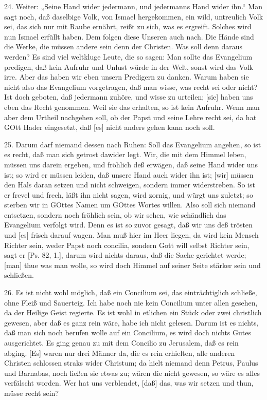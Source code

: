 24. Weiter: „Seine Hand wider jedermann, und jedermanns Hand wider ihn.“ Man sagt noch, daß daselbige Volk, von Ismael hergekommen, ein wild, untreulich Volk sei, das sich nur mit Raube ernährt, reißt zu sich, was es ergreift. Solches wird nun Ismael erfüllt haben. Dem folgen diese Unseren auch nach. Die Hände sind die Werke, die müssen andere sein denn der Christen. Was soll denn daraus werden? Es sind viel weltkluge Leute, die so sagen: Man sollte das Evangelium predigen, daß kein Aufruhr und Unlust würde in der Welt, sonst wird das Volk irre. Aber das haben wir eben unsern Predigern zu danken. Warum haben sie nicht also das Evangelium vorgetragen, daß man wisse, was recht sei oder nicht? Ist doch geboten, daß jedermann zuhöre, und wisse zu urteilen; [sie] haben uns eben das Recht genommen. Weil sie das erhalten, so ist kein Aufruhr. Wenn man aber dem Urtheil nachgehen soll, ob der Papst und seine Lehre recht sei, da hat GOtt Hader eingesetzt, daß [es] nicht anders gehen kann noch soll.

25. Darum darf niemand dessen nach Ruhen: Soll das Evangelium angehen, so ist es recht, daß man sich getrost dawider legt. Wir, die
mit dem Himmel leben, müssen uns darein ergeben, und fröhlich deß erwägen, daß seine Hand wider uns ist; so wird er müssen leiden, daß unsere Hand auch wider ihn ist; [wir] müssen den Hals daran setzen und nicht schweigen, sondern immer widerstreben. So ist er frevel und frech, läßt ihn nicht sagen, wird zornig, und würgt uns zuletzt; so sterben wir in GOttes Namen um GOttes Wortes willen. Also soll sich niemand entsetzen, sondern noch fröhlich sein, ob wir sehen, wie schändlich das Evangelium verfolgt wird. Denn es ist so zuvor gesagt, daß wir uns deß trösten und [es] frisch darauf wagen. Man muß hier im Heer liegen, da wird kein Mensch Richter sein, weder Papst noch concilia, sondern Gott will selbst Richter sein, sagt er [Ps. 82, 1.], darum wird nichts daraus, daß die Sache gerichtet werde; [man] thue was man wolle, so wird doch Himmel auf seiner Seite stärker sein und schließen.

26. Es ist nicht wohl möglich, daß ein Concilium sei, das einträchtiglich schließe, ohne Fleiß und Sauerteig. Ich habe noch nie kein Concilium unter allen gesehen, da der Heilige Geist regierte. Es ist wohl in etlichen ein Stück oder zwei christlich gewesen, aber daß es ganz rein wäre, habe ich nicht gelesen. Darum ist es nichts, daß man sich noch berufen wolle auf ein Concilium, es wird doch nichts Gutes ausgerichtet. Es ging genau zu mit dem Concilio zu Jerusalem, daß es rein abging. [Es] waren nur drei Männer da, die es rein erhielten, alle anderen Christen schlossen straks wider Christum; da hielt niemand denn Petrus, Paulus und Barnabas, noch ließen sie etwas zu; wären die nicht gewesen, so wäre es alles verfälscht worden. Wer hat uns verblendet, [daß] das, was wir setzen und thun, müsse recht sein?

